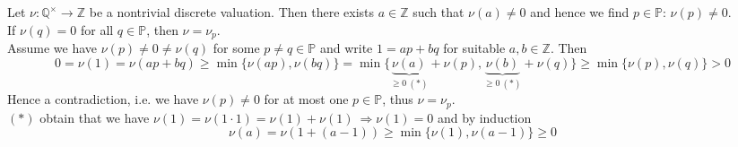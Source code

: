 \documentclass[11pt]{book}
\theoremstyle{nonumberbreak}
\newenvironment{ex}[1][]{\ifthenelse{\equal{#1}{}}{\example}{\example[#1]}\rm}{\endexample}
\begin{document}
\begin{spacing}{1.3}
\begin{ex} %
Let $\nu: \mathbb{Q}^{\times} \longrightarrow \mathbb{Z}$ be a nontrivial discrete valuation. Then there exists $a \in \mathbb{Z}$ such that $\nu(a)\neq 0$ and hence we find $p \in \mathbb{P}$: $\nu(p) \neq 0$.\\
If $\nu(q)=0$ for all $q \in \mathbb{P}$, then $\nu=\nu_p$.\\
Assume we have $\nu(p) \neq 0 \neq \nu(q)$ for some $p \neq q \in \mathbb{P}$ and write $1=ap+bq$ for suitable $a,b \in \mathbb{Z}$. Then 
$$0=\nu(1) = \nu(ap+bq) \geqslant \min\{\nu(ap), \nu(bq)\}
= \min\{\underbrace{\nu(a)}_{\geqslant 0 \ (*)} + \nu(p), \underbrace{\nu(b)}_{\geqslant 0 \ (*)} + \nu(q) \} \geqslant \min\{\nu(p), \nu(q)\} > 0$$
Hence a contradiction, i.e. we have $\nu(p) \neq 0$ for at most one $p \in \mathbb{P}$, thus $\nu=\nu_p$. \\
$(*)$ obtain that we have $\nu(1)=\nu(1 \cdot 1 )=\nu(1)+\nu(1) \ \Rightarrow \nu(1)=0$ and by induction $$\nu(a)=\nu(1+(a-1))\geqslant \min\{\nu(1), \nu(a-1)\} \geqslant 0$$
\end{ex}



\end{spacing}
\end{document}

